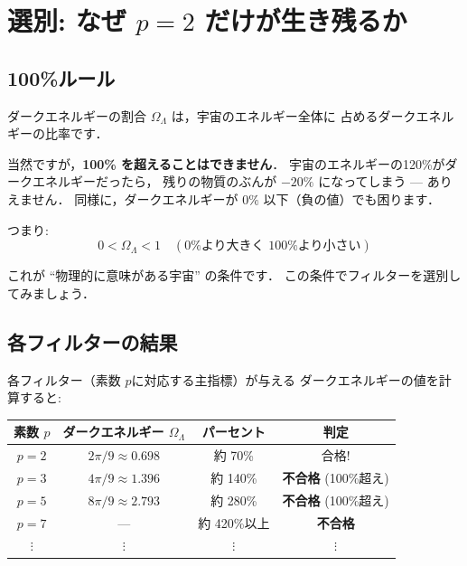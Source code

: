 \documentclass[11pt,a4paper]{article}
\begin{document}
\section{選別: なぜ $p=2$ だけが生き残るか}

\subsection{100\%ルール}

ダークエネルギーの割合 $\Omega_\Lambda$ は，宇宙のエネルギー全体に
占めるダークエネルギーの比率です．

当然ですが，\textbf{100\% を超えることはできません}．
宇宙のエネルギーの120\%がダークエネルギーだったら，
残りの物質のぶんが $-20\%$ になってしまう
--- ありえません．
同様に，ダークエネルギーが $0\%$ 以下（負の値）でも困ります．

つまり:
\begin{equation*}
0 < \Omega_\Lambda < 1 \quad (\text{0\% より大きく 100\% より小さい})
\end{equation*}

これが ``物理的に意味がある宇宙'' の条件です．
この条件でフィルターを選別してみましょう．

\subsection{各フィルターの結果}

各フィルター（素数 $p$に対応する主指標）が与える
ダークエネルギーの値を計算すると:

\begin{center}
\begin{tabular}{cccc}
\toprule
素数 $p$ & ダークエネルギー $\Omega_\Lambda$ & パーセント & 判定 \\
\midrule
$p=2$ & $2\pi/9 \approx 0.698$ & 約 70\% & 合格! \\
$p=3$ & $4\pi/9 \approx 1.396$ & 約 140\% & \textbf{不合格} (100\%超え) \\
$p=5$ & $8\pi/9 \approx 2.793$ & 約 280\% & \textbf{不合格} (100\%超え) \\
$p=7$ & --- & 約 420\%以上 & \textbf{不合格} \\
$\vdots$ & $\vdots$ & $\vdots$ & $\vdots$ \\
\bottomrule
\end{tabular}
\end{center}
\end{document}
